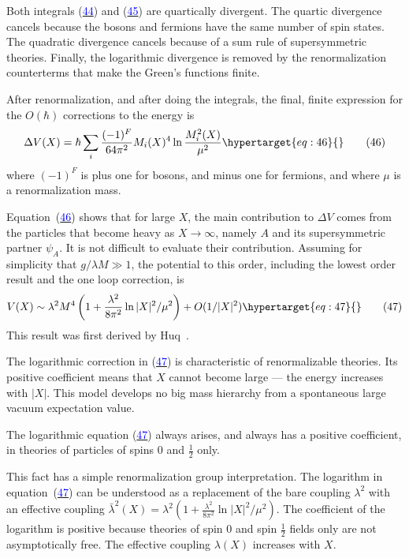 \documentclass[11pt,a4paper]{article}
\newcommand{\eqtarget}[1]{\hypertarget{eq:#1}{\mathstrut}\tag{#1}}
\newcommand{\eqnref}[1]{(\hyperlink{eq:#1}{\textcolor{blue}{#1}})}
\begin{document}
Both integrals \eqnref{44} and \eqnref{45} are quartically divergent. The
quartic divergence cancels because the bosons and fermions have the
same number of spin states. The quadratic divergence cancels because
of a sum rule of supersymmetric theories. Finally, the logarithmic
divergence is removed by the renormalization counterterms that
make the Green's functions finite.

After renormalization, and after doing the integrals, the final,
finite expression for the $O(\hbar)$ corrections to the energy is
\begin{equation}
\Delta V(X) = \hbar \sum_i \frac{(-1)^F}{64\pi^2} M_i(X)^4 \ln \frac{M_i^2(X)}{\mu^2}
\eqtarget{46}
\end{equation}
where $(-1)^F$ is plus one for bosons, and minus one for fermions, and
where $\mu$ is a renormalization mass.

Equation~\eqnref{46} shows that for large $X$, the main contribution to
$\Delta V$ comes from the particles that become heavy as $X \to \infty$, namely $A$ and
its supersymmetric partner $\psi_A$. It is not difficult to evaluate their
contribution. Assuming for simplicity that $g/\lambda M \gg 1$, the potential
to this order, including the lowest order result and the one loop
correction, is
\begin{equation}
V(X) \sim \lambda^2 M^4 \left(1 + \frac{\lambda^2}{8\pi^2}\ln |X|^2/\mu^2\right) + O(1/|X|^2)
\eqtarget{47}
\end{equation}
This result was first derived by Huq~\cite{ref16}.

The logarithmic correction in \eqnref{47} is characteristic of renormalizable
theories. Its positive coefficient means that $X$ cannot
become large --- the energy increases with $|X|$. This model develops
no big mass hierarchy from a spontaneous large vacuum expectation
value.

The logarithmic equation \eqnref{47} always arises, and always has a
positive coefficient, in theories of particles of spins $0$ and $\frac{1}{2}$ only.

This fact has a simple renormalization group interpretation. The
logarithm in equation~\eqnref{47} can be understood as a replacement of the
bare coupling $\lambda^2$ with an effective coupling $\bar\lambda^2(X) =
\lambda^2 \left(1 + \frac{\lambda^2}{8\pi^2}\ln |X|^2/\mu^2\right)$. The coefficient of the logarithm is positive because theories of spin $0$ and spin $\frac{1}{2}$ fields only are not
asymptotically free. The effective coupling $\lambda(X)$ increases with $X$.
\end{document}
